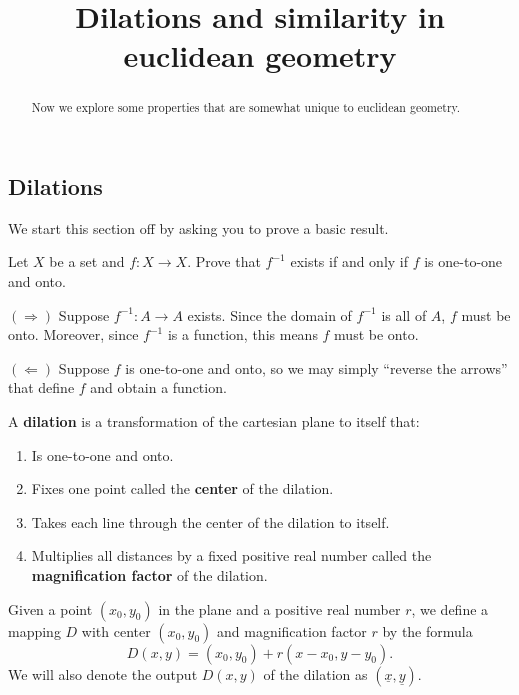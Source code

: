\documentclass[newpage,hints,handout,12pt,noauthor,nooutcomes]{ximera}
\title{Dilations and similarity in euclidean geometry}
\begin{document}
\begin{abstract}
Now we explore some properties that are somewhat unique to euclidean
geometry.
\end{abstract}
\maketitle

\subsection{Dilations}

We start this section off by asking you to prove a basic result.

\begin{problem}
  Let $X$ be a set and $f: X \to X$. Prove that $f^{-1}$ exists if and
  only if $f$ is one-to-one and onto.
  \begin{freeResponse}
    $(\Rightarrow)$ Suppose $f^{-1}:A\to A$ exists. Since the domain
    of $f^{-1}$ is all of $A$, $f$ must be onto. Moreover, since
    $f^{-1}$ is a function, this means $f$ must be onto. 
    
    $(\Leftarrow)$ Suppose $f$ is one-to-one and onto, so we may simply
    ``reverse the arrows'' that define $f$ and obtain a function.
  \end{freeResponse}
\end{problem}


\begin{definition}
A \textbf{dilation} is a transformation of the cartesian plane to
itself that:
\begin{enumerate}
\item Is one-to-one and onto.
\item Fixes one point called the \textbf{center} of the dilation.
\item Takes each line through the center of the dilation to itself.
\item Multiplies all distances by a fixed positive real number called
  the \textbf{magnification factor} of the dilation.
\end{enumerate}
\end{definition}

\begin{definition}
Given a point $\left(x_{0},y_{0}\right)$ in the plane and a positive
real number $r$, we define a mapping $D$ with center $\left(
x_{0},y_{0}\right)$ and magnification factor $r$ by the formula
\[
D\left(  x,y\right)  =\left(  x_{0},y_{0}\right)  +r\left(  x-x_{0}%
,y-y_{0}\right).
\]
We will also denote the output $D\left(x,y\right)$ of the dilation
as $\left(\underline{x},\underline{y}\right)$.
\end{definition}
\end{document}
